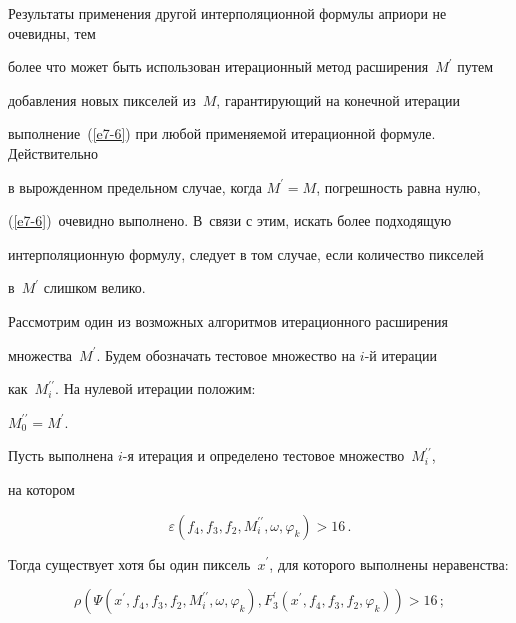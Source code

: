 Результаты применения другой интерполяционной формулы априори не очевидны, тем


более что может быть использован итерационный метод расширения~$M^\prime$ путем


добавления новых пикселей из~$M$, гарантирующий на конечной итерации


выполнение~(\ref{e7-6}) при любой применяемой итерационной формуле. Действительно


в вырожденном предельном случае, когда $M^\prime =M$, погрешность равна нулю,


(\ref{e7-6})~очевидно выполнено. В~связи с этим, искать более подходящую


интерполяционную формулу, следует в том случае, если количество пикселей


в~$M^\prime$ слишком велико.





Рассмотрим один из возможных алгоритмов итерационного расширения


множества~$M^\prime$. Будем обозначать тестовое множество на $i$-й итерации


как~$M^{\prime\prime}_i$. На нулевой итерации положим:\linebreak


$M^{\prime\prime}_0=M^\prime$.





Пусть выполнена $i$-я итерация и определено тестовое множество~$M^{\prime\prime}_i$,


на котором


$$


\varepsilon (f_4,f_3,f_2,M^{\prime\prime}_i,\omega,\varphi_k)>16\,.


$$


Тогда существует хотя бы один пиксель~$x^\prime$, для которого выполнены неравенства:


$$


\rho\left(\Psi (x^\prime,


f_4,f_3,f_2,M^{\prime\prime}_i,\omega,\varphi_k),F^\prime_3(x^\prime,f_4,f_3,f_


2,\varphi_k)\right)>16\,;


$$





\vspace*{-14pt}





